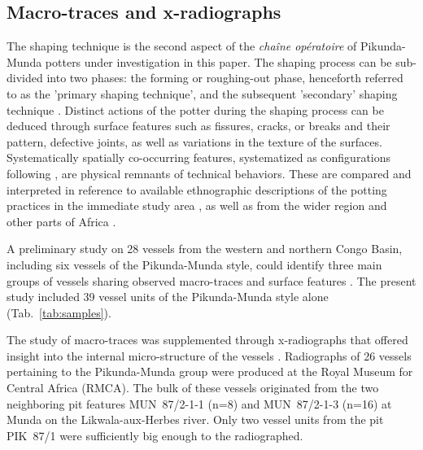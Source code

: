 \documentclass[smallextended,natbib]{svjour3}       %
\begin{document}
\subsection{Macro-traces and x-radiographs}

The shaping technique is the second aspect of the \textit{chaîne opératoire} of Pikunda-Munda potters under investigation in this paper. The shaping process can be sub-divided into two phases: the forming or roughing-out phase, henceforth referred to as the 'primary shaping technique', and the subsequent 'secondary' shaping technique \citep{Shepard.1956,Rye.1981,LivingstoneSmith.2007a,LivingstoneSmith.2010c}. Distinct actions of the potter during the shaping process can be deduced through surface features such as fissures, cracks, or breaks and their pattern, defective joints, as well as variations in the texture of the surfaces. Systematically spatially co-occurring features, systematized as configurations following \citet{LivingstoneSmith.2007a,LivingstoneSmith.2010c}, are physical remnants of technical behaviors. These are compared and interpreted in reference to available ethnographic descriptions of the potting practices in the immediate study area \citep{Eggert.1980c,Eggert.inVorb.}, as well as from the wider region \citep{Gosselain.1992,Gosselain.2002,Gosselain.1997,LivingstoneSmith.2007b,LivingstoneSmith.2010a,LivingstoneSmith.2016,LivingstoneSmith.2009,LivingstoneSmith.2010c} and other parts of Africa \citep{Gallay.1998,GasparDaSilva.2005,Gosselain.2005,Gosselain.2006,LivingstoneSmith.2007a,Mayor.2011a,Gosselain.2014}.

A preliminary study on 28 vessels from the western and northern Congo Basin, including six vessels of the Pikunda-Munda style, could identify three main groups of vessels sharing observed macro-traces and surface features \citep[45--60,69--73]{Seidensticker.2021e}. The present study included 39 vessel units of the Pikunda-Munda style alone (Tab.~\ref{tab:samples}).

The study of macro-traces was supplemented through x-radiographs that offered insight into the internal micro-structure of the vessels \citep{Stevenson.1953,Rye.1977,Vandiver.1987}. Radiographs of 26 vessels pertaining to the Pikunda-Munda group were produced at the Royal Museum for Central Africa (RMCA). The bulk of these vessels originated from the two neighboring pit features MUN~87/2-1-1 (n=8) and MUN~87/2-1-3 (n=16) at Munda on the Likwala-aux-Herbes river. Only two vessel units from the pit PIK~87/1 were sufficiently big enough to the radiographed.
\end{document}

